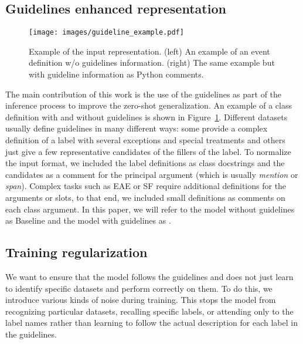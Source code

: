 \subsection{Guidelines enhanced representation}

\begin{figure}
    \centering
    \texttt{[image: images/guideline\_example.pdf]}
    \caption{Example of the input representation. (left) An example of an event definition w/o guidelines information. (right) The same example but with guideline information as Python comments.}
    \vspace{-0.7em}
    \label{fig:guidelines-example}
\end{figure}

The main contribution of this work is the use of the guidelines as part of the inference process to improve the zero-shot generalization. An example of a class definition with and without guidelines is shown in Figure~\ref{fig:guidelines-example}. Different datasets usually define guidelines in many different ways: some provide a complex definition of a label with several exceptions and special treatments and others just give a few representative candidates of the fillers of the label. To normalize the input format, we included the label definitions as class docstrings and the candidates as a comment for the principal argument (which is usually \textit{mention} or \textit{span}). Complex tasks such as EAE or SF require additional definitions for the arguments or slots, to that end,  we included small definitions as comments on each class argument. 
In this paper, we will refer to the model without guidelines as Baseline and the model with guidelines as \GoLLIET.

\subsection{Training regularization}
\label{sec:components}

We want to ensure that the model follows the guidelines and does not just learn to identify specific datasets and perform correctly on them. To do this, we introduce various kinds of noise during training. This stops the model from recognizing particular datasets, recalling specific labels, or attending only to the label names rather than learning to follow the actual description for each label in the guidelines.

